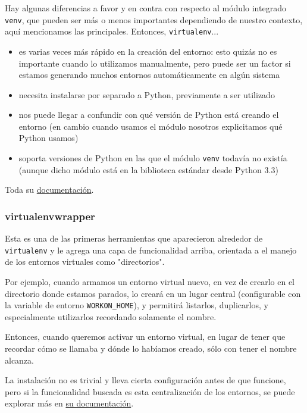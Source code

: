 Hay algunas diferencias a favor y en contra con respecto al módulo integrado \texttt{venv}, que pueden ser más o menos importantes dependiendo de nuestro contexto, aquí mencionamos las principales. Entonces, \texttt{virtualenv}...

\begin{itemize}
 \item es varias veces más rápido en la creación del entorno: esto quizás no es importante cuando lo utilizamos manualmente, pero puede ser un factor si estamos generando muchos entornos automáticamente en algún sistema
 \item necesita instalarse por separado a Python, previamente a ser utilizado
 \item nos puede llegar a confundir con qué versión de Python está creando el entorno (en cambio cuando usamos el módulo  nosotros explicitamos qué Python usamos)
 \item soporta versiones de Python en las que el módulo \texttt{venv} todavía no existía (aunque dicho módulo está en la biblioteca estándar desde Python 3.3)
\end{itemize}

Toda su \href{https://virtualenv.pypa.io/en/latest/}{documentación}.


\subsubsection{virtualenvwrapper}

Esta es una de las primeras herramientas que aparecieron alrededor de \texttt{virtualenv} y le agrega una capa de funcionalidad arriba, orientada a el manejo de los entornos virtuales como "directorios".

Por ejemplo, cuando armamos un entorno virtual nuevo, en vez de crearlo en el directorio donde estamos parados, lo creará en un lugar central (configurable con la variable de entorno \verb|WORKON_HOME|), y permitirá listarlos, duplicarlos, y especialmente utilizarlos recordando solamente el nombre.

Entonces, cuando queremos activar un entorno virtual, en lugar de tener que recordar cómo se llamaba y dónde lo habíamos creado, sólo con tener el nombre alcanza.

La instalación no es trivial y lleva cierta configuración antes de que funcione, pero si la funcionalidad buscada es esta centralización de los entornos, se puede explorar más en \href{https://virtualenvwrapper.readthedocs.io/en/latest/}{su documentación}.


